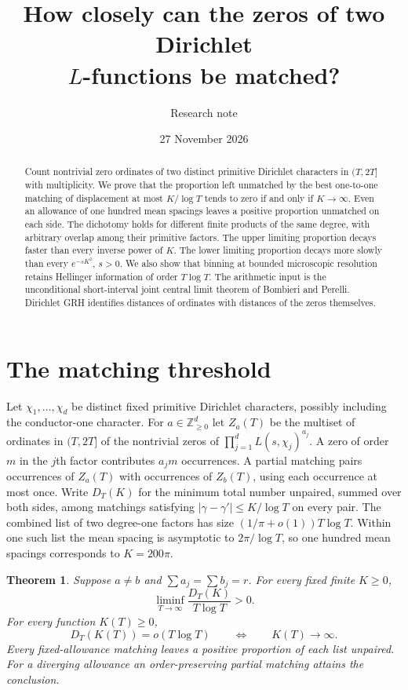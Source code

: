 \documentclass[11pt]{article}
\title{How closely can the zeros of two Dirichlet\\ \(L\)-functions be matched?}
\author{Research note}
\date{27 November 2026}
\newtheorem{theorem}{Theorem}[section]
\begin{document}
\maketitle
\begin{abstract}
Count nontrivial zero ordinates of two distinct primitive Dirichlet characters
in \((T,2T]\) with multiplicity. We prove that the proportion left unmatched by the
best one-to-one matching of displacement at most \(K/\log T\) tends to zero
if and only if \(K\to\infty\). Even an allowance of one hundred mean spacings
leaves a positive proportion unmatched on each side. The dichotomy holds for
different finite products of the same degree, with arbitrary overlap among their
primitive factors. The upper limiting proportion decays faster than every inverse power of \(K\). The lower limiting proportion decays more slowly than every \(e^{-sK^2}\), \(s>0\). We also show that
binning at bounded microscopic resolution retains Hellinger information of order
\(T\log T\). The arithmetic input is the unconditional short-interval
joint central limit theorem of Bombieri and Perelli. Dirichlet GRH identifies
distances of ordinates with distances of the zeros themselves.
\end{abstract}

\section{The matching threshold}

Let \(\chi_1,\ldots,\chi_d\) be distinct fixed primitive Dirichlet characters,
possibly including the conductor-one character. For \(a\in\mathbb Z_{\ge0}^d\)
let \(Z_a(T)\) be the multiset of ordinates in \((T,2T]\) of the nontrivial zeros
of \(\prod_{j=1}^d L(s,\chi_j)^{a_j}\). A zero of order \(m\) in the \(j\)th
factor contributes \(a_jm\) occurrences. A partial matching pairs occurrences of
\(Z_a(T)\) with occurrences of \(Z_b(T)\), using each occurrence at most
once. Write \(D_T(K)\) for the minimum total number unpaired, summed over both
sides, among matchings satisfying \(|\gamma-\gamma'|\le K/\log T\) on every
pair. The combined list of two degree-one factors has size
\((1/\pi+o(1))T\log T\). Within one such list the mean spacing is asymptotic
to \(2\pi/\log T\), so one hundred mean spacings corresponds to \(K=200\pi\).

\begin{theorem}\label{th:threshold}
Suppose \(a\ne b\) and \(\sum a_j=\sum b_j=r\). For every fixed finite \(K\ge0\),
\[
 \liminf_{T\to\infty}\frac{D_T(K)}{T\log T}>0 .
\]
For every function \(K(T)\ge0\),
\[
 D_T(K(T))=o(T\log T)\qquad\Longleftrightarrow\qquad K(T)\longrightarrow\infty .
\]
Every fixed-allowance matching leaves a positive proportion of each list
unpaired. For a diverging allowance an order-preserving partial matching
attains the conclusion.
\end{theorem}
\end{document}
